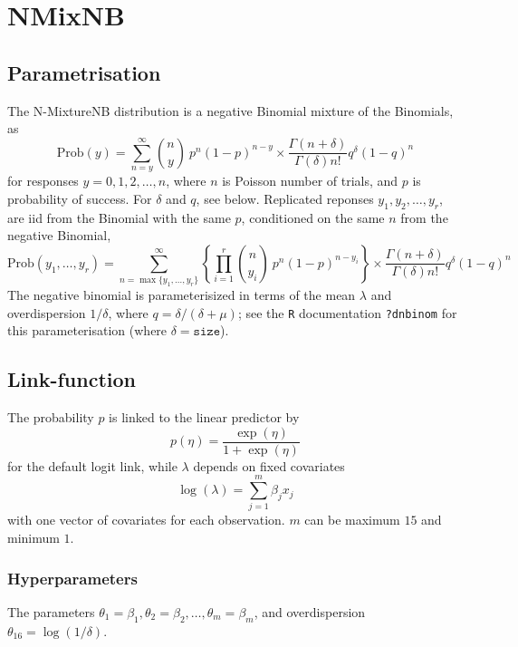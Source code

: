 \documentclass[a4paper,11pt]{article}
\def\mmax{15}
\def\mmaxp1{16}
\begin{document}
\section*{NMixNB}

\subsection*{Parametrisation}

The N-MixtureNB distribution is a negative Binomial mixture of the
Binomials, as
\begin{displaymath}
    \text{Prob}(y) = \sum_{n=y}^{\infty} {n \choose y} \ p^n
    (1-p)^{n-y} \times \frac{\Gamma(n + \delta)}{\Gamma(\delta) n!}
    q^{\delta}(1-q)^{n}
\end{displaymath}
for responses $y=0, 1, 2, \ldots,n$, where $n$ is Poisson number of
trials, and $p$ is probability of success. For $\delta$ and $q$, see
below. Replicated reponses $y_1, y_2, \ldots, y_r$, are iid from the
Binomial with the same $p$, conditioned on the same $n$ from the
negative Binomial,
\begin{displaymath}
    \text{Prob}(y_1, \ldots, y_r) = \sum_{n=\max\{y_1, \ldots,
        y_r\}}^{\infty} \left\{\prod_{i=1}^{r}
      {n \choose y_i} \ p^n
      (1-p)^{n-y_i}\right\} \times \frac{\Gamma(n + \delta)}{\Gamma(\delta) n!}
    q^{\delta}(1-q)^{n}
\end{displaymath}
The negative binomial is parameterisized in terms of the mean
$\lambda$ and overdispersion $1/\delta$, where
$q = \delta/(\delta + \mu)$; see the \texttt{R} documentation
\texttt{?dnbinom} for this parameterisation (where
$\delta=\texttt{size}$).

\subsection*{Link-function}

The probability $p$ is linked to the linear predictor by
\begin{displaymath}
    p(\eta) = \frac{\exp(\eta)}{1+\exp(\eta)}
\end{displaymath}
for the default logit link, while $\lambda$ depends on fixed
covariates
\begin{displaymath}
    \log(\lambda) = \sum_{j=1}^{m} \beta_j x_j
\end{displaymath}
with one vector of covariates for each observation. $m$ can be maximum
$\mmax$ and minimum $1$.

\subsubsection*{Hyperparameters}
The parameters
$\theta_1=\beta_1, \theta_2=\beta_2, \ldots, \theta_m=\beta_m$, and
overdispersion $\theta_{\mmaxp1} = \log(1/\delta)$.
\end{document}

